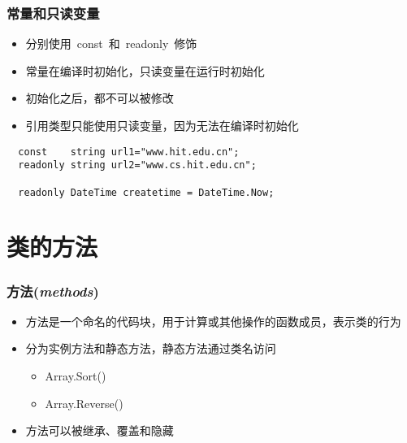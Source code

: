 \begin{frame}[fragile]
\frametitle{常量和只读变量}
\begin{itemize}
\setlength{\itemsep}{8pt plus 1pt}
\item 分别使用~const~和~readonly~修饰
\item 常量在编译时初始化，只读变量在运行时初始化
\item 初始化之后，都不可以被修改
\item 引用类型只能使用只读变量，因为无法在编译时初始化
\end{itemize}
\begin{lstlisting}
  const    string url1="www.hit.edu.cn";
  readonly string url2="www.cs.hit.edu.cn";

  readonly DateTime createtime = DateTime.Now;
\end{lstlisting}
\end{frame}

\section{类的方法}
\begin{frame}
\frametitle{方法(\textit{methods})}
\begin{itemize}
\setlength{\itemsep}{8pt plus 1pt}
\item 方法是一个命名的代码块，用于计算或其他操作的函数成员，表示类的行为
\item 分为实例方法和静态方法，静态方法通过类名访问
  \begin{itemize}
  \item Array.Sort()
  \item Array.Reverse()
  \end{itemize}
\item 方法可以被继承、覆盖和隐藏
\end{itemize}
\end{frame}

